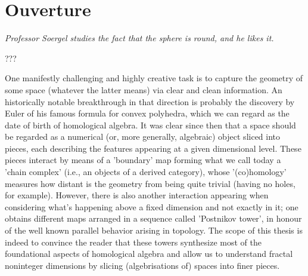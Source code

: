 \section{Ouverture}
\epigraph{\textit{Professor Soergel studies the fact that the sphere is round, and he likes it.}}{???}
\vspace{10 mm}
One manifestly challenging and highly creative task is to capture the geometry of some space (whatever the latter means) via clear and clean information. An historically notable breakthrough in that direction is probably the discovery by Euler of his famous formula for convex polyhedra, which we can regard as the date of birth of homological algebra. It was clear since then that a space should be regarded as a numerical (or, more generally, algebraic) object sliced into pieces, each describing the features appearing at a given dimensional level. These pieces interact by means of a 'boundary' map forming what we call today a 'chain complex' (i.e., an objects of a derived category), whose '(co)homology' measures how distant is the geometry from being quite trivial (having no holes, for example). However, there is also another interaction appearing when considering what's happening above a fixed dimension and not exactly in it; one obtains different maps arranged in a sequence called 'Postnikov tower', in honour of the well known parallel behavior arising in topology. The scope of this thesis is indeed to convince the reader that these towers synthesize most of the foundational aspects of homological algebra and allow us to understand fractal noninteger dimensions by slicing (algebrisations of) spaces into finer pieces. \\

